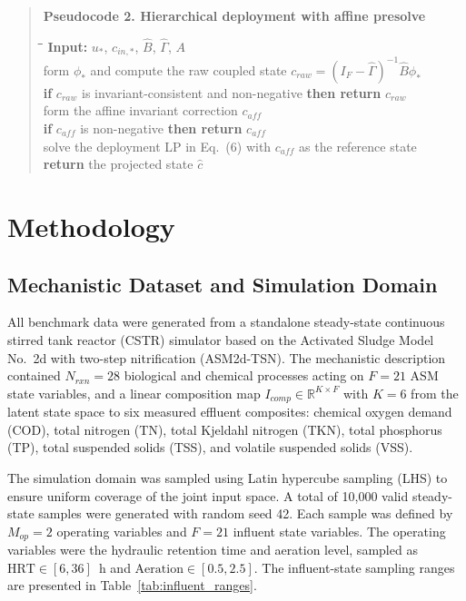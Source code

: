 \documentclass[11pt]{article}
\begin{document}
\begin{quote}
\noindent\textbf{Pseudocode 2. Hierarchical deployment with affine presolve}
\begin{tabbing}
\hspace{0.6cm}\=\hspace{0.6cm}\=\hspace{0.6cm}\=\kill
\textbf{Input:} $u_*$, $c_{in,*}$, $\widehat{B}$, $\widehat{\Gamma}$, $A$ \\
form $\phi_*$ and compute the raw coupled state $c_{raw} = (I_F - \widehat{\Gamma})^{-1}\widehat{B}\phi_*$ \\
\textbf{if} $c_{raw}$ is invariant-consistent and non-negative \textbf{then return} $c_{raw}$ \\
form the affine invariant correction $c_{aff}$ \\
\textbf{if} $c_{aff}$ is non-negative \textbf{then return} $c_{aff}$ \\
solve the deployment LP in Eq.~(6) with $c_{aff}$ as the reference state \\
\textbf{return} the projected state $\hat{c}$
\end{tabbing}
\end{quote}

\section{Methodology}

\subsection{Mechanistic Dataset and Simulation Domain}

All benchmark data were generated from a standalone steady-state continuous stirred tank reactor (CSTR) simulator based on the Activated Sludge Model No.\ 2d with two-step nitrification (ASM2d-TSN). The mechanistic description contained $N_{rxn} = 28$ biological and chemical processes acting on $F = 21$ ASM state variables, and a linear composition map $I_{comp} \in \mathbb{R}^{K \times F}$ with $K = 6$ from the latent state space to six measured effluent composites: chemical oxygen demand (COD), total nitrogen (TN), total Kjeldahl nitrogen (TKN), total phosphorus (TP), total suspended solids (TSS), and volatile suspended solids (VSS).

The simulation domain was sampled using Latin hypercube sampling (LHS) to ensure uniform coverage of the joint input space. A total of 10,000 valid steady-state samples were generated with random seed 42. Each sample was defined by $M_{op} = 2$ operating variables and $F = 21$ influent state variables. The operating variables were the hydraulic retention time and aeration level, sampled as $\mathrm{HRT} \in [6,36]$~h and $\mathrm{Aeration} \in [0.5,2.5]$. The influent-state sampling ranges are presented in Table~\ref{tab:influent_ranges}.
\end{document}
